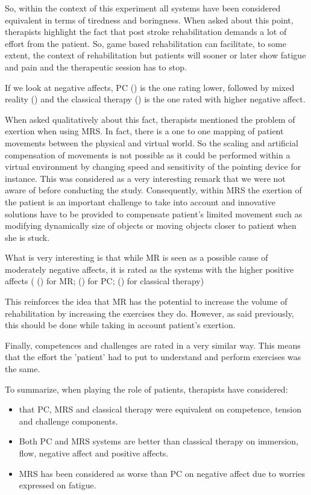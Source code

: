 \documentclass[preprint,authoryear,12pt]{elsarticle}
\begin{document}
So, within the context of this experiment all systems have been considered equivalent in terms of tiredness and boringness. When asked about this point, therapists highlight the fact that post stroke rehabilitation demands a lot of effort from the patient. So, game based rehabilitation can facilitate, to some extent, the context of rehabilitation but patients will sooner or later show fatigue and pain and the therapeutic session has to stop.

If we look at negative affects, PC () is the one rating lower, followed by mixed reality () and the classical therapy () is the one rated with higher negative affect. 

When asked qualitatively about this fact, therapists mentioned the problem of exertion when using MRS. In fact, there is a one to one mapping of patient movements between the physical and virtual world. So the scaling and artificial compensation of movements is not possible as it could be performed within a virtual environment by changing speed and sensitivity of the pointing device for instance. This was considered as a very interesting remark that we were not aware of before conducting the study. Consequently, within MRS the exertion of the patient is an important challenge to take into account and innovative solutions have to be provided to compensate patient's limited movement such as modifying dynamically size of objects or moving objects closer to patient when she is stuck. 
 

What is very interesting is that while MR is seen as a possible cause of moderately negative affects, it is rated as the systems with the higher positive affects ( () for MR; () for PC;  () for classical therapy)

This reinforces the idea that MR has the potential to increase the volume of rehabilitation by increasing the exercises they do. However, as said previously, this should be done while taking in account patient's exertion.

Finally, competences and challenges are rated in a very similar way. This means that the effort the 'patient' had to put to understand and perform exercises was the same. 

To summarize, when playing the role of patients, therapists have considered:
 \begin{itemize}
\item that PC, MRS and classical therapy were equivalent on competence, tension and challenge components.
\item Both PC and MRS systems are better than classical therapy on immersion, flow, negative affect and positive affects.
\item MRS has been considered as worse than PC on negative affect due to worries expressed on fatigue. 
\end{itemize}
\end{document}
